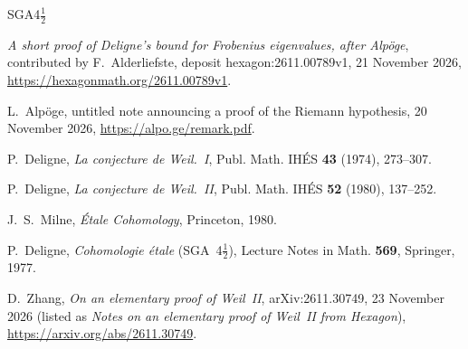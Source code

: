 \documentclass[reqno]{amsart}
\theoremstyle{definition}
\theoremstyle{plain}
\begin{document}
\begin{thebibliography}{SGA4\(\frac12\)}

\emph{A short proof of Deligne's bound for Frobenius eigenvalues, after Alpöge}, contributed by F.~Alderliefste, deposit hexagon:2611.00789v1, 21 November 2026, \url{https://hexagonmath.org/2611.00789v1}.

L.~Alp\"oge, untitled note announcing a proof of the Riemann hypothesis, 20 November 2026, \url{https://alpo.ge/remark.pdf}.

P.~Deligne, \emph{La conjecture de Weil.~I}, Publ. Math. IH\'ES \textbf{43} (1974), 273--307.

P.~Deligne, \emph{La conjecture de Weil.~II}, Publ. Math. IH\'ES \textbf{52} (1980), 137--252.

J.~S.~Milne, \emph{\'Etale Cohomology}, Princeton, 1980.

P.~Deligne, \emph{Cohomologie \'etale} (SGA~4\(\frac12\)), Lecture Notes in Math. \textbf{569}, Springer, 1977.

D.~Zhang, \emph{On an elementary proof of Weil~II}, arXiv:2611.30749, 23 November 2026 (listed as \emph{Notes on an elementary proof of Weil~II from Hexagon}), \url{https://arxiv.org/abs/2611.30749}.

\end{thebibliography}
\end{document}
